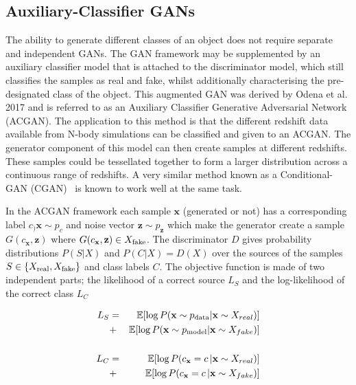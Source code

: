 \documentclass[twocolumn]{article}
\newcommand\EE{\mathbb{E}}
\numberwithin{equation}{section}
\begin{document}
\subsection{Auxiliary-Classifier GANs}
The ability to generate different classes of an object does not require separate and independent GANs. The GAN framework 
may be supplemented by an auxiliary classifier model that is attached to the discriminator model, which still classifies 
the samples as real and fake, whilst additionally characterising the pre-designated class of the object. This augmented 
GAN was derived by Odena et al. 2017 \cite{acgan} and is referred to as an Auxiliary Classifier Generative Adversarial 
Network (ACGAN). The application to this method is that the different redshift data available from N-body simulations can 
be classified and given to an ACGAN. The generator component of this model can then create samples at different redshifts. 
These samples could be tessellated together to form a larger distribution across a continuous range of  redshifts. A very 
similar method known as a Conditional-GAN (CGAN)~\cite{cgan} is known to work well at the same task.

In the ACGAN framework each sample $\mathbf{x}$ (generated or not) has a corresponding label $c_)\mathbf{x} \sim p_c$ and noise vector $\mathbf{z} \sim p_\mathbf{z}$ 
which make the generator create a sample $G(c_\mathbf{x}, \mathbf{z})$ where $G(c_\mathbf{x}, \mathbf{z}) \in X_\textup{fake}$.
The discriminator $D$ gives probability distributions $P(S|X)$ and $P(C|X) = D(X)$ over the sources of the samples $S \in \{X_\textup{real}, X_\textup{fake}\}$ and class labels $C$. The objective function is made of two independent parts; the 
likelihood of a correct source $L_S$ and the log-likelihood of the correct class $L_C$

\begin{eqnarray}
    L_S &=& \EE [\log P(\mathbf{x} \sim p_{\textup{data}} | \mathbf{x} \sim X_{real})] \nonumber \\
        &+& \EE [\log P(\mathbf{x} \sim p_{\textup{model}} | \mathbf{x} \sim X_{fake})] \\ 
        & & \nonumber \\ 
    L_C &=& \EE [\log P(c_\mathbf{x} = c \, | \mathbf{x} \sim X_{real})] \nonumber \\
        &+& \EE [\log P(c_\mathbf{x} = c \, | \mathbf{x} \sim X_{fake})]
\end{eqnarray}
\end{document}
